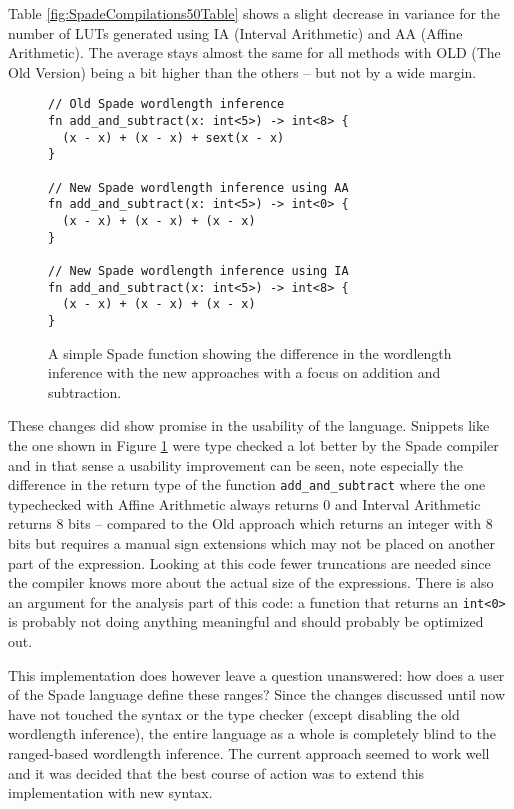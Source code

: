 Table \ref{fig:SpadeCompilations50Table} shows a slight decrease in variance for the number of LUTs generated using {IA (Interval Arithmetic)} and {AA (Affine Arithmetic)}. The average stays almost the same for all methods with {OLD (The Old Version)} being a bit higher than the others -- but not by a wide margin.

\begin{figure}[h!]
\begin{verbatim}
// Old Spade wordlength inference
fn add_and_subtract(x: int<5>) -> int<8> {
  (x - x) + (x - x) + sext(x - x)
}

// New Spade wordlength inference using AA
fn add_and_subtract(x: int<5>) -> int<0> {
  (x - x) + (x - x) + (x - x)
}

// New Spade wordlength inference using IA
fn add_and_subtract(x: int<5>) -> int<8> {
  (x - x) + (x - x) + (x - x)
}
\end{verbatim}
  \caption{A simple Spade function showing the difference in the wordlength inference with the new approaches with a focus on addition and subtraction.}
  \label{fig:CodeThatWorksNow}
\end{figure}

These changes did show promise in the usability of the language. Snippets like the one shown in Figure \ref{fig:CodeThatWorksNow} were type checked a lot better by the Spade compiler and in that sense a usability improvement can be seen, note especially the difference in the return type of the function \verb+add_and_subtract+ where the one typechecked with {Affine Arithmetic} always returns 0 and {Interval Arithmetic} returns 8 bits -- compared to the {Old} approach which returns an integer with 8 bits but requires a manual sign extensions which may not be placed on another part of the expression. Looking at this code fewer truncations are needed since the compiler knows more about the actual size of the expressions. There is also an argument for the analysis part of this code: a function that returns an \verb+int<0>+ is probably not doing anything meaningful and should probably be optimized out.

This implementation does however leave a question unanswered: how does a user of the Spade language define these ranges? Since the changes discussed until now have not touched the syntax or the type checker (except disabling the old wordlength inference), the entire language as a whole is completely blind to the ranged-based wordlength inference. The current approach seemed to work well and it was decided that the best course of action was to extend this implementation with new syntax.

